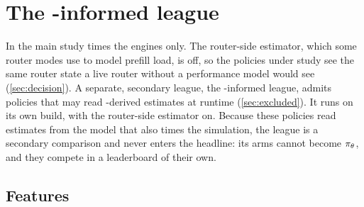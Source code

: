 %

\section{The \ais{}-informed league}
\label{app:ais-league}
\label{sec:res-ais}

In the main study \ais{} times the engines only. The router-side \ais{} estimator, which some router
modes use to model prefill load, is off, so the policies under study see the same router state a
live router without a performance model would see (\cref{sec:decision}). A separate, secondary
league, the \ais{}-informed league, admits policies that may read \ais{}-derived estimates at
runtime (\cref{sec:excluded}). It
runs on its own build, with the router-side estimator on. Because these policies read estimates from the model that also times
the simulation, the league is a secondary comparison and never enters the headline: its arms cannot
become $\pi_{\theta}$, and they compete in a leaderboard of their own.

\subsection{Features}

